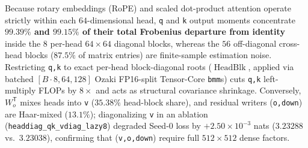 \documentclass[11pt]{article}
\newcommand{\Tr}{{\mathsf{T}}}
\newcommand{\BlkDiag}{\operatorname{HeadBlk}}
\newcommand{\E}{\mathbb{E}}
\newcommand{\dhd}{d_{\mathrm{head}}}
\begin{document}
\begin{table}[t]
\centering
\caption{32-layer checkpoint audit (\texttt{step\_002560}) of output second moments $B_p = \E[\delta_p \delta_p^\Tr]$ and exact damped $(-1/2)$ inverse roots across projection roles at 130M ($H=8$, $\dhd=64$).}
\label{tab:audit}
\end{table}

Because rotary embeddings (RoPE) and scaled dot-product attention operate strictly within each $64$-dimensional head, \texttt{q} and \texttt{k} output moments concentrate \textbf{$99.39\%$ and $99.15\%$ of their total Frobenius departure from identity} inside the $8$ per-head $64\times 64$ diagonal blocks, whereas the $56$ off-diagonal cross-head blocks ($87.5\%$ of matrix entries) are finite-sample estimation noise. Restricting \texttt{q,k} to exact per-head block-diagonal roots ($\BlkDiag$, applied via batched $[B\cdot 8, 64, 128]$ Ozaki FP16-split Tensor-Core \texttt{bmm}s) cuts \texttt{q,k} left-multiply FLOPs by $8\times$ and acts as structural covariance shrinkage. Conversely, $W_o^\Tr$ mixes heads into \texttt{v} ($35.38\%$ head-block share), and residual writers (\texttt{o,down}) are Haar-mixed ($13.1\%$); diagonalizing \texttt{v} in an ablation (\texttt{headdiag\_qk\_vdiag\_lazy8}) degraded Seed-0 loss by $+2.50\times 10^{-3}$ nats ($3.23288$ vs.\ $3.23038$), confirming that (\texttt{v,o,down}) require full $512\times 512$ dense factors.
\end{document}
